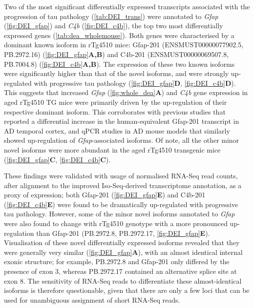 Two of the most significant differentially expressed transcripts associated with the progression of tau pathology (\cref{tab:DEI_trans}) were annotated to \textit{Gfap} (\cref{fig:DEI_gfap}) and \textit{C4b} (\cref{fig:DEI_c4b}), the top two most differentially expressed genes (\cref{tab:dea_wholemouse}). Both genes were characterised by a dominant known isoform in rTg4510 mice: Gfap-201 (ENSMUST00000077902.5, PB.2972.16) (\cref{fig:DEI_gfap}\textbf{A,B}) and C4b-201 (ENSMUST00000069507.8, PB.7004.8) (\cref{fig:DEI_c4b}\textbf{A,B}). The expression of these two known isoforms were significantly higher than that of the novel isoforms, and were strongly up-regulated with progressive tau pathology (\cref{fig:DEI_gfap}\textbf{D}, \cref{fig:DEI_c4b}\textbf{D}). This suggests that increased \textit{Gfap} (\cref{fig:whole_dea}\textbf{A}) and \textit{C4b} gene expression in aged rTg4510 TG mice were primarily driven by the up-regulation of their respective dominant isoform. This corroborates with previous studies that reported a differential increase in the human-equivalent Gfap-201 transcript in AD temporal cortex\cite{Roelofs2005}, and qPCR studies in AD mouse models that similarly showed up-regulation of \textit{Gfap}-associated isoforms\cite{Kamphuis2012}. Of note, all the other minor novel isoforms were more abundant in the aged rTg4510 transgenic mice (\cref{fig:DEI_gfap}\textbf{C}, \cref{fig:DEI_c4b}\textbf{C}).

These findings were validated with usage of normalised RNA-Seq read counts, after alignment to the improved Iso-Seq-derived transcriptome annotation, as a proxy of expression; both Gfap-201 (\cref{fig:DEI_gfap}\textbf{E}) and C4b-201 (\cref{fig:DEI_c4b}\textbf{E}) were found to be dramatically up-regulated with progressive tau pathology. However, some of the minor novel isoforms annotated to \textit{Gfap} were also found to change with rTg4510 genotype with a more pronounced up-regulation than Gfap-201 (PB.2972.8, PB.2972.17, \cref{fig:DEI_gfap}\textbf{E}). Visualisation of these novel differentially expressed isoforms revealed that they were generally very similar (\cref{fig:DEI_gfap}\textbf{A}), with an almost identical internal exonic structure; for example, PB.2972.8 and Gfap-201 only differed by the presence of exon 3, whereas PB.2972.17 contained an alternative splice site at exon 8. The sensitivity of RNA-Seq reads to differentiate these almost-identical isoforms is therefore questionable, given that there are only a few loci that can be used for unambiguous assignment of short RNA-Seq reads.  

